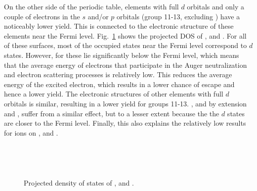 \begin{refsection}
On the other side of the periodic table, elements with full $d$ orbitals and 
only a couple of electrons in the $s$ and/or $p$ orbitals (group 11-13, 
excluding ) have a noticeably lower yield. This is connected to the 
electronic structure of these elements near the Fermi level. Fig.~\ref{quotas:fig-pdos} 
shows the projected DOS of ,  and . 
For all of these surfaces, most of the occupied states near the Fermi level 
correspond to $d$ states. However, for  these 
lie significantly below the Fermi level, which means that the average energy of electrons that 
participate in the Auger neutralization and electron scattering processes is 
relatively low. This reduces the average energy of the excited electron, 
which results in a lower chance of escape and hence a lower yield. The electronic  structures of 
other elements with full $d$ orbitals is similar, resulting in a lower yield 
for groups 11-13. , and by extension  and , suffer from a
similar effect, but to a lesser extent because the 
the $d$ states are closer to the Fermi level. Finally, this also explains the relatively low results for  ions on ,  and . 

{
\begin{figure}[ht] 
    \centering
    \captionsetup{width=0.9\textwidth}
    \begin{subfigure}[t]{0.33\textwidth} 
        \centering 
        
    \end{subfigure}%
    ~  
    \begin{subfigure}[t]{0.29\textwidth} 
        \centering 
        
    \end{subfigure} 
    ~
    \begin{subfigure}[t]{0.29\textwidth}
        \centering 
          
    \end{subfigure}
    \caption{\label{quotas:fig-pdos}Projected density of states of ,  and .} 
\end{figure}
}
 

\end{refsection}

